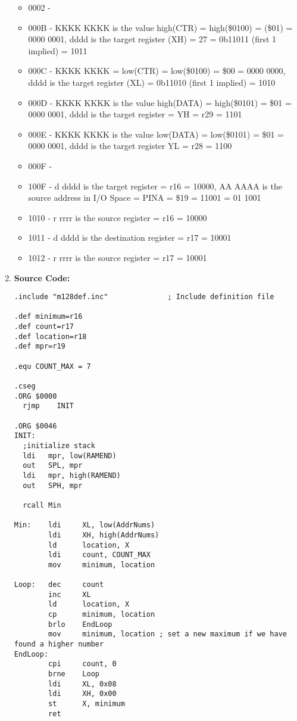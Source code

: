 \documentclass{article}
\begin{document}
\begin{enumerate}
\begin{itemize}
        \item 0002 -
        \item 000B - KKKK KKKK is the value high(CTR) = high(\$0100) = (\$01) = 0000 0001, dddd is the target register (XH) = 27 = 0b11011 (first 1 implied) = 1011
        \item 000C - KKKK KKKK = low(CTR) = low(\$0100) = \$00 = 0000 0000, dddd is the target register (XL) = 0b11010 (first 1 implied) = 1010
        \item 000D - KKKK KKKK is the value high(DATA) = high(\$0101) = \$01 = 0000 0001, dddd is the target register = YH = r29 = 1101
        \item 000E - KKKK KKKK is the value low(DATA) = low(\$0101) = \$01 = 0000 0001, dddd is the target register YL = r28 = 1100
        \item 000F -
        \item 100F - d dddd is the target register = r16 = 10000, AA AAAA is the source address in I/O Space = PINA = \$19 = 11001 = 01 1001
        \item 1010 - r rrrr is the source register = r16 = 10000
        \item 1011 - d dddd is the destination register = r17 = 10001
        \item 1012 - r rrrr is the source register = r17 = 10001
      \end{itemize}
  \item\textbf{Source Code:}
    \begin{verbatim}
.include "m128def.inc"				; Include definition file

.def minimum=r16
.def count=r17
.def location=r18
.def mpr=r19

.equ COUNT_MAX = 7

.cseg
.ORG $0000
  rjmp    INIT

.ORG $0046
INIT:
  ;initialize stack
  ldi	mpr, low(RAMEND)
  out	SPL, mpr
  ldi	mpr, high(RAMEND)
  out	SPH, mpr

  rcall Min

Min:	ldi		XL, low(AddrNums)
		ldi		XH, high(AddrNums)
		ld		location, X
		ldi		count, COUNT_MAX
		mov		minimum, location

Loop:	dec		count
		inc		XL
		ld		location, X
		cp		minimum, location 
		brlo	EndLoop
		mov		minimum, location ; set a new maximum if we have found a higher number
EndLoop:
		cpi		count, 0
		brne	Loop
		ldi		XL, 0x08
		ldi		XH, 0x00
		st		X, minimum
		ret
    \end{verbatim}
  \end{enumerate}
\end{document}
